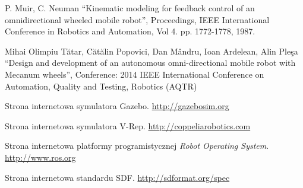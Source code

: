 \begin{thebibliography}{0}

 P. Muir, C. Neuman ``Kinematic modeling for feedback control of an omnidirectional wheeled mobile robot'', 
 Proceedings, IEEE International Conference in Robotics and Automation, 
 Vol 4. pp. 1772-1778, 1987.

Mihai Olimpiu Tătar, Cătălin Popovici, Dan Mândru, Ioan Ardelean, Alin Pleşa ``Design and development of an autonomous omni-directional mobile robot with Mecanum wheels'',
Conference: 2014 IEEE International Conference on Automation, Quality and Testing, Robotics (AQTR)

Strona internetowa symulatora Gazebo.
\url{http://gazebosim.org}

Strona internetowa symulatora V-Rep.
\url{http://coppeliarobotics.com}

Strona internetowa platformy programistycznej \emph{Robot Operating System}.
\url{http://www.ros.org}

Strona internetowa standardu SDF.
\url{http://sdformat.org/spec}

\end{thebibliography}
